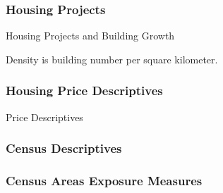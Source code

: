\documentclass[aspectratio=149]{beamer}
\begin{document}

\begin{frame}
\frametitle{Housing Projects}
\begin{table}
\caption{Housing Projects and Building Growth}

\end{table}
\vspace{.2cm} 
Density is building number per square kilometer.
\end{frame}


\begin{frame}
\frametitle{Housing Price Descriptives}
\begin{table}
\caption{Price Descriptives}
\centering
\resizebox{.95\textwidth}{!}{  

}
\end{table}
\end{frame}


\begin{frame}
\frametitle{Census Descriptives}

\centering
\resizebox{\textwidth}{!}{  

}

\end{frame}


\begin{frame}
\frametitle{Census Areas Exposure Measures}
\begin{center}
\begin{figure}
\vspace{-3mm}
\end{figure}
\end{center}
\end{frame}



\end{document}
